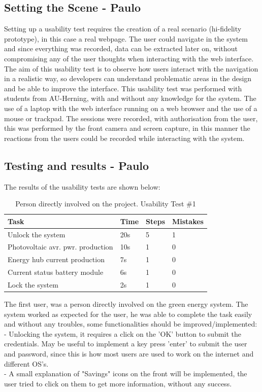 \subsection{Setting the Scene - Paulo}
Setting up a usability test requires the creation of a real scenario (hi-fidelity prototype), in this case a real webpage. The user could navigate in the system and since everything was recorded, data can be extracted later on, without compromising any of the user thoughts when interacting with the web interface.\p
The aim of this usability test is to observe how users interact with the navigation in a realistic way, so developers can understand problematic areas in the design and be able to improve the interface.\p
This usability test was performed with students from AU-Herning, with and without any knowledge for the system. The use of a laptop with the web interface running on a web browser and the use of a mouse or trackpad. The sessions were recorded, with authorisation from the user, this was performed by the front camera and screen capture, in this manner the reactions from the users could be recorded while interacting with the system.\p

\subsection{Testing and results - Paulo}

The results of the usability tests are shown below:

\begin{table}[H]
	\begin{tabular}{ | l | l | l | l |}
		\hline
		Task 				 	     & 		Time 	& 	Steps 	& 	Mistakes 		\\ \hline
		Unlock the system    			     & 		20s  		& 	 5 		& 	1 			\\ \hline
		Photovoltaic avr. pwr. production  & 		10s 		& 	 1 		& 	0 			\\ \hline
		Energy hub current production 	     & 		7s 		& 	 1 		& 	0			 \\ \hline
		Current status battery module 	     & 		6s 		& 	 1 		& 	0 			 \\ \hline
		Lock the system 			     & 		2s 		& 	 1 		& 	0 			 \\ \hline
	\end{tabular}
    \caption{Person directly involved on the project. Usability Test \#1}
\end{table}
The first user, was a person directly involved on the green energy system. The system worked as expected for the user, he was able to complete the task easily and without any troubles, some functionalities should be improved/implemented:\\
- Unlocking the system, it requires a click on the 'OK' button to submit the credentials. May be useful to implement a key press 'enter' to submit the user and password, since this is how most users are used to work on the internet and different OS's.\\
- A small explanation of "Savings" icons on the front will be implemented, the user tried to click on them to get more information, without any success.\\

